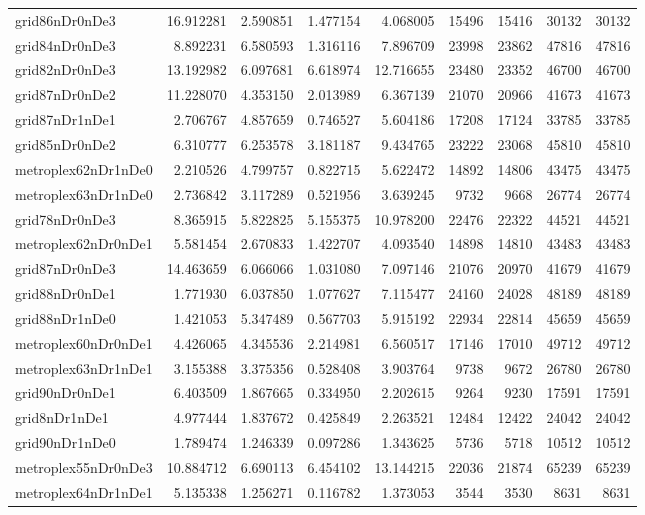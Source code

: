 \begin{longtable}{|l|r|r|r|r|r|r|r|r|}
grid86nDr0nDe3 & 16.912281 & 2.590851 & 1.477154 & 4.068005 & 15496 & 15416 & 30132 & 30132 \\
grid84nDr0nDe3 & 8.892231 & 6.580593 & 1.316116 & 7.896709 & 23998 & 23862 & 47816 & 47816 \\
grid82nDr0nDe3 & 13.192982 & 6.097681 & 6.618974 & 12.716655 & 23480 & 23352 & 46700 & 46700 \\
grid87nDr0nDe2 & 11.228070 & 4.353150 & 2.013989 & 6.367139 & 21070 & 20966 & 41673 & 41673 \\
grid87nDr1nDe1 & 2.706767 & 4.857659 & 0.746527 & 5.604186 & 17208 & 17124 & 33785 & 33785 \\
grid85nDr0nDe2 & 6.310777 & 6.253578 & 3.181187 & 9.434765 & 23222 & 23068 & 45810 & 45810 \\
metroplex62nDr1nDe0 & 2.210526 & 4.799757 & 0.822715 & 5.622472 & 14892 & 14806 & 43475 & 43475 \\
metroplex63nDr1nDe0 & 2.736842 & 3.117289 & 0.521956 & 3.639245 & 9732 & 9668 & 26774 & 26774 \\
grid78nDr0nDe3 & 8.365915 & 5.822825 & 5.155375 & 10.978200 & 22476 & 22322 & 44521 & 44521 \\
metroplex62nDr0nDe1 & 5.581454 & 2.670833 & 1.422707 & 4.093540 & 14898 & 14810 & 43483 & 43483 \\
grid87nDr0nDe3 & 14.463659 & 6.066066 & 1.031080 & 7.097146 & 21076 & 20970 & 41679 & 41679 \\
grid88nDr0nDe1 & 1.771930 & 6.037850 & 1.077627 & 7.115477 & 24160 & 24028 & 48189 & 48189 \\
grid88nDr1nDe0 & 1.421053 & 5.347489 & 0.567703 & 5.915192 & 22934 & 22814 & 45659 & 45659 \\
metroplex60nDr0nDe1 & 4.426065 & 4.345536 & 2.214981 & 6.560517 & 17146 & 17010 & 49712 & 49712 \\
metroplex63nDr1nDe1 & 3.155388 & 3.375356 & 0.528408 & 3.903764 & 9738 & 9672 & 26780 & 26780 \\
grid90nDr0nDe1 & 6.403509 & 1.867665 & 0.334950 & 2.202615 & 9264 & 9230 & 17591 & 17591 \\
grid8nDr1nDe1 & 4.977444 & 1.837672 & 0.425849 & 2.263521 & 12484 & 12422 & 24042 & 24042 \\
grid90nDr1nDe0 & 1.789474 & 1.246339 & 0.097286 & 1.343625 & 5736 & 5718 & 10512 & 10512 \\
metroplex55nDr0nDe3 & 10.884712 & 6.690113 & 6.454102 & 13.144215 & 22036 & 21874 & 65239 & 65239 \\
metroplex64nDr1nDe1 & 5.135338 & 1.256271 & 0.116782 & 1.373053 & 3544 & 3530 & 8631 & 8631 \\

\end{longtable}
